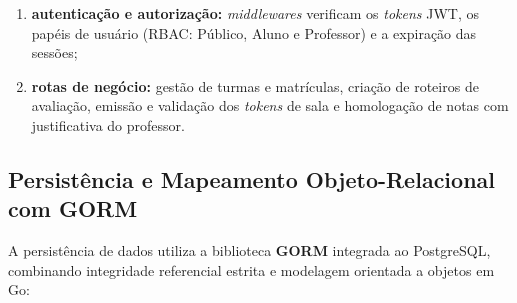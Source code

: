 \begin{enumerate}
    \item \textbf{autenticação e autorização:} \textit{middlewares} verificam os \textit{tokens} JWT, os papéis de usuário (RBAC: Público, Aluno e Professor) e a expiração das sessões;
    \item \textbf{rotas de negócio:} gestão de turmas e matrículas, criação de roteiros de avaliação, emissão e validação dos \textit{tokens} de sala e homologação de notas com justificativa do professor.
\end{enumerate}

\subsection{Persistência e Mapeamento Objeto-Relacional com GORM}
\label{sec:gorm-persistencia}

A persistência de dados utiliza a biblioteca \textbf{GORM} integrada ao PostgreSQL, combinando integridade referencial estrita e modelagem orientada a objetos em Go:

